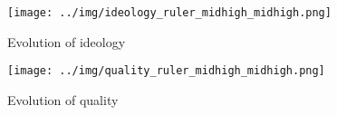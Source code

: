\begin{figure}[!h]
  \centering
  \caption{Evolution of ideology}
  \texttt{[image: ../img/ideology\_ruler\_midhigh\_midhigh.png]}
  \label{fig:quality_midhigh_midhigh}
\end{figure}

\begin{figure}[!h]
  \centering
  \caption{Evolution of quality}
  \texttt{[image: ../img/quality\_ruler\_midhigh\_midhigh.png]}
  \label{fig:quality_midhigh_midhigh}
\end{figure}

\clearpage

